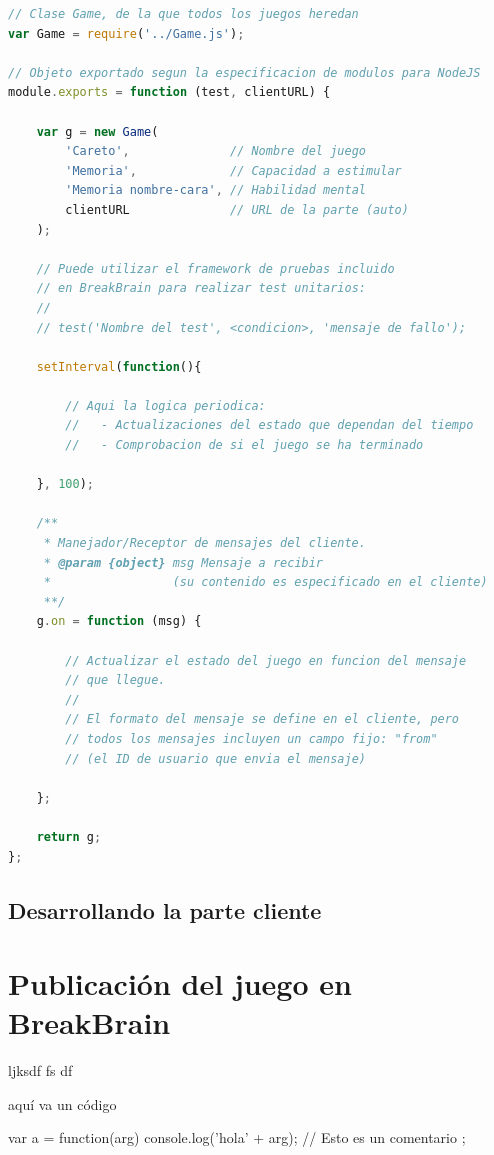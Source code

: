 \newpage
\begin{lstlisting}[frame=single, language=JavaScript, caption={Esquema de la parte servidora de un juego para BreakBrain}, label=code::game-server-scheme]
// Clase Game, de la que todos los juegos heredan
var Game = require('../Game.js');

// Objeto exportado segun la especificacion de modulos para NodeJS
module.exports = function (test, clientURL) {

    var g = new Game(
        'Careto',              // Nombre del juego
        'Memoria',             // Capacidad a estimular
        'Memoria nombre-cara', // Habilidad mental
        clientURL              // URL de la parte (auto)
    );

    // Puede utilizar el framework de pruebas incluido
    // en BreakBrain para realizar test unitarios:
    // 
    // test('Nombre del test', <condicion>, 'mensaje de fallo');

    setInterval(function(){

        // Aqui la logica periodica:
        //   - Actualizaciones del estado que dependan del tiempo
        //   - Comprobacion de si el juego se ha terminado

    }, 100);

    /**
     * Manejador/Receptor de mensajes del cliente.
     * @param {object} msg Mensaje a recibir
     *                 (su contenido es especificado en el cliente)
     **/
    g.on = function (msg) {

        // Actualizar el estado del juego en funcion del mensaje
        // que llegue.
        //
        // El formato del mensaje se define en el cliente, pero
        // todos los mensajes incluyen un campo fijo: "from"
        // (el ID de usuario que envia el mensaje)

    };

    return g;
};
\end{lstlisting}

\subsection{Desarrollando la parte cliente}


\section{Publicación del juego en BreakBrain}









ljksdf
fs
df




aquí va un código

\begin{listing}[language=JavaScript, caption={Hola mundo en C}, label=code:hello]
var a = function(arg){
  console.log('hola' + arg); // Esto es un comentario
};
\end{listing}

